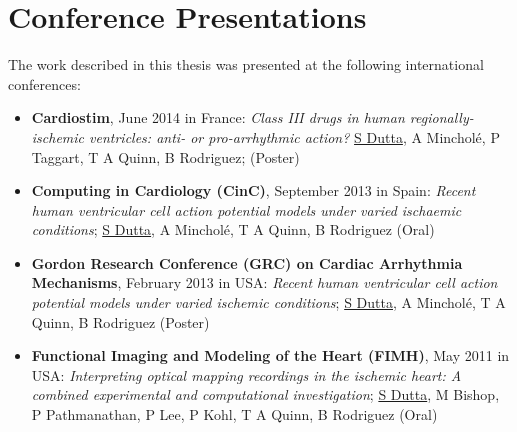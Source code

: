 \vspace*{20mm}
{
%
%
%

\section*{Conference Presentations}

The work described in this thesis was presented at the following international conferences:

\begin{itemize}
\item \textbf{Cardiostim}, June 2014 in France: \textit{Class III drugs in human regionally-ischemic ventricles: anti- or pro-arrhythmic action?} \underline{S Dutta}, A Minchol\'{e}, P Taggart, T A Quinn, B Rodriguez; (Poster)
\item \textbf{Computing in Cardiology (CinC)}, September 2013 in Spain: \textit{Recent human ventricular cell action potential models under varied ischaemic conditions}; \underline{S Dutta}, A Minchol\'{e}, T A Quinn, B Rodriguez (Oral)
\item \textbf{Gordon Research Conference (GRC) on Cardiac Arrhythmia Mechanisms}, February 2013 in USA: \textit{Recent human ventricular cell action potential models under varied ischemic conditions}; \underline{S Dutta}, A Minchol\'{e}, T A Quinn, B Rodriguez (Poster)
\item \textbf{Functional Imaging and Modeling of the Heart (FIMH)}, May 2011 in USA: \textit{Interpreting optical mapping recordings in the ischemic heart: A combined experimental and computational investigation}; \underline{S Dutta}, M Bishop, P Pathmanathan, P Lee, P Kohl, T A Quinn, B Rodriguez (Oral)
\end{itemize}

}
